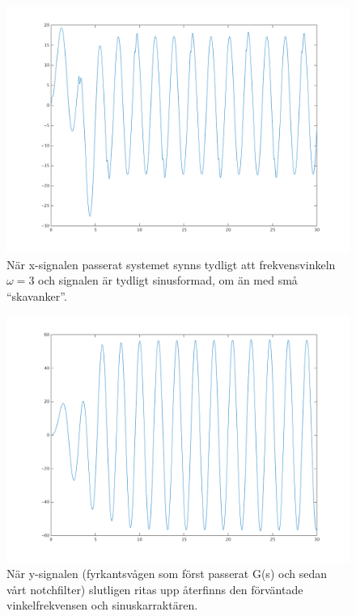 \begin{figure}
    \label{fig:task4e-xsignal-sys2}
    \caption{När x-signalen passerat systemet synns tydligt att frekvensvinkeln
    $\omega = 3$ och signalen är tydligt sinusformad, om än med små
    ``skavanker''.}
    \centering
    \includegraphics[scale=0.55]{figures/task4e-xsignal-sys2.png}
\end{figure}

\begin{figure}
    \label{fig:task4e-y-sys2}
    \caption{När y-signalen (fyrkantsvågen som först passerat G(s) och sedan
    vårt notchfilter) slutligen ritas upp återfinns den förväntade
    vinkelfrekvensen och sinuskarraktären.}
    \centering
    \includegraphics[scale=0.55]{figures/task4e-y-sys2.png}
\end{figure}
